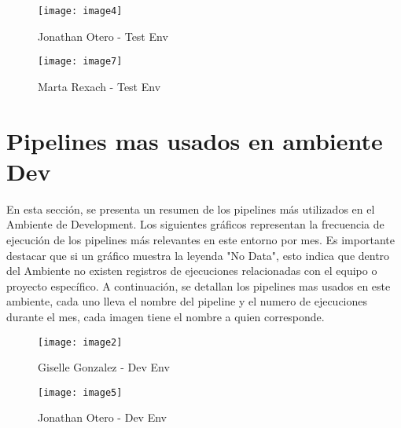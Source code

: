 \documentclass{article}
\begin{document}
    \vspace{0.8cm}
    
\begin{figure}[H]
    \centering
        \texttt{[image: image4]}
        \caption{Jonathan Otero - Test Env}
\end{figure}

    \vspace{0.8cm}
    
\begin{figure}[H]
    \centering
        \texttt{[image: image7]}
        \caption{Marta Rexach - Test Env}
\end{figure}

\newpage

\section{Pipelines mas usados en ambiente Dev}

\vspace{0.5cm}

En esta sección, se presenta un resumen de los pipelines más utilizados en el Ambiente de Development. Los siguientes gráficos representan la frecuencia de ejecución de los pipelines más relevantes en este entorno por mes.
Es importante destacar que si un gráfico muestra la leyenda "No Data", esto indica que dentro del Ambiente no existen registros de ejecuciones relacionadas con el equipo o proyecto específico.
A continuación, se detallan los pipelines mas usados en este ambiente, cada uno lleva el nombre del pipeline y el numero de ejecuciones durante el mes, cada imagen tiene el nombre a quien corresponde.

\vspace{0.8cm}

\begin{figure}[H]
    \centering
        \texttt{[image: image2]}
        \caption{Giselle Gonzalez - Dev Env}
\end{figure}

    \vspace{0.8cm}
    
\begin{figure}[H]
    \centering
        \texttt{[image: image5]}
        \caption{Jonathan Otero - Dev Env}
\end{figure}

    \vspace{0.8cm}
    
\end{document}
